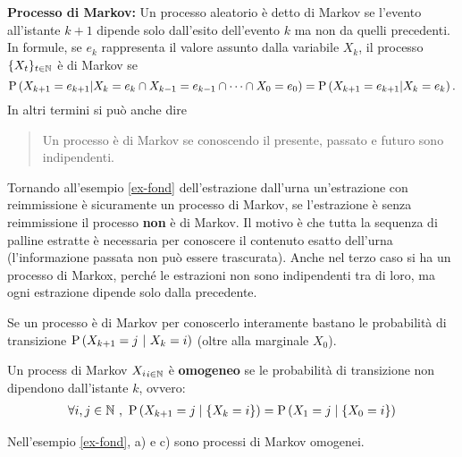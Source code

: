 \begin{defn}
	\textbf{Processo di Markov:}
	Un processo aleatorio \`e detto di Markov  se l'evento all'istante $k+1$ dipende solo dall'esito dell'evento
	$k$ ma non da quelli precedenti. In formule, se $e_k$ rappresenta il valore assunto dalla variabile $X_k$, il processo $\{X_t\}_{t\in \mathbb{N}}$ \`e di Markov se
	$$\text{P}\left(X_{k+1}=e_{k+1} | X_k=e_k\cap X_{k-1}=e_{k-1}\cap\dots\cap X_0=e_0\right)=\text{P}\left(X_{k+1}=e_{k+1} | X_k=e_k\right).
	$$
In altri termini si pu\`o anche dire
	\begin{quote}
		{Un processo \`e  di Markov se conoscendo il presente, passato e futuro sono indipendenti.}
	\end{quote}
\end{defn}
	\begin{exmp}
	Tornando all'esempio \ref{ex-fond} dell'estrazione dall'urna  un'estrazione con reimmissione \`e  sicuramente un processo di Markov, se l'estrazione \`e  senza reimmissione il processo \textbf{non} \`e  di Markov. Il motivo \`e  che tutta la sequenza di palline estratte \`e  necessaria per conoscere il contenuto esatto dell'urna (l'informazione passata non pu\`o  essere trascurata). Anche nel terzo caso si ha un processo di Markox, perch\'e le estrazioni non sono indipendenti tra di loro, ma ogni estrazione dipende solo dalla precedente.
\end{exmp}

\begin{note} Se un processo \`e di Markov per conoscerlo interamente bastano le probabilit\`a di
transizione $\p{X_{k+1}=j\ |\ X_{k}=i}$ (oltre alla marginale $X_0$).
\end{note}



\begin{defn}
	Un process di Markov $ {X_i}_{i\in \mathbb{N}} $ \`e  \textbf{omogeneo} se le probabilit\`a di transizione non dipendono dall'istante $k$, ovvero:
	\begin{equation*}
	\begin{aligned}
		\forall i,j \in \mathbb{N}\ ,\  \text{P}\left(X_{k+1} = j \mid \{X_k = i\}\right) = \text{P}\left(X_1 = j \mid  \{X_0 = i\}\right)
	\end{aligned}
	\end{equation*}
\end{defn}

\begin{exmp}
	Nell'esempio \ref{ex-fond}, a) e c) sono processi di Markov omogenei.
\end{exmp}

